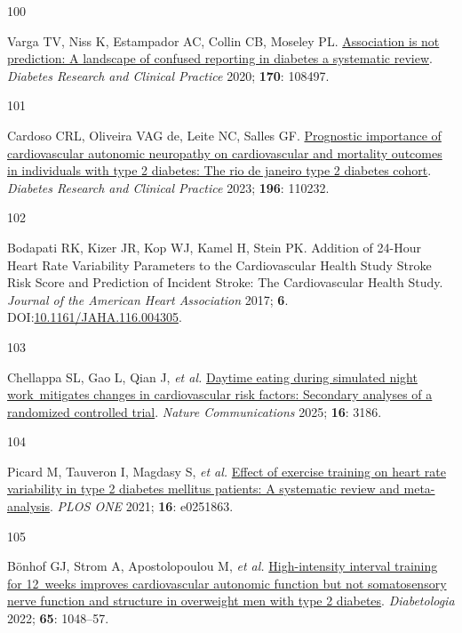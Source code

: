 \documentclass[
  a4paper,
  headsepline=true,
  open=any]{scrbook}
\newlength{\cslhangindent}
\newlength{\csllabelwidth}
\newlength{\cslentryspacingunit} %
\newenvironment{CSLReferences}[2] %
 {%
  \setlength{\parindent}{0pt}
  \ifodd #1
  \let\oldpar\par
  \def\par{\hangindent=\cslhangindent\oldpar}
  \fi
  \setlength{\parskip}{#2\cslentryspacingunit}
 }%
 {}
\newcommand{\CSLLeftMargin}[1]{\parbox[t]{\csllabelwidth}{#1}}
\newcommand{\CSLRightInline}[1]{\parbox[t]{\linewidth - \csllabelwidth}{#1}\break}
\begin{document}
\begin{CSLReferences}{0}{0}
\leavevmode{}%
\CSLLeftMargin{100 }%
\CSLRightInline{Varga TV, Niss K, Estampador AC, Collin CB, Moseley PL.
\href{https://doi.org/10.1016/j.diabres.2020.108497}{Association is not
prediction: A landscape of confused reporting in diabetes {\textendash}
a systematic review}. \emph{Diabetes Research and Clinical Practice}
2020; \textbf{170}: 108497.}

\leavevmode{}%
\CSLLeftMargin{101 }%
\CSLRightInline{Cardoso CRL, Oliveira VAG de, Leite NC, Salles GF.
\href{https://doi.org/10.1016/j.diabres.2022.110232}{Prognostic
importance of cardiovascular autonomic neuropathy on cardiovascular and
mortality outcomes in individuals with type 2 diabetes: The rio de
janeiro type 2 diabetes cohort}. \emph{Diabetes Research and Clinical
Practice} 2023; \textbf{196}: 110232.}

\leavevmode{}%
\CSLLeftMargin{102 }%
\CSLRightInline{Bodapati RK, Kizer JR, Kop WJ, Kamel H, Stein PK.
Addition of 24-Hour Heart Rate Variability Parameters to the
Cardiovascular Health Study Stroke Risk Score and Prediction of Incident
Stroke: The Cardiovascular Health Study. \emph{Journal of the American
Heart Association} 2017; \textbf{6}.
DOI:\href{https://doi.org/10.1161/JAHA.116.004305}{10.1161/JAHA.116.004305}.}

\leavevmode{}%
\CSLLeftMargin{103 }%
\CSLRightInline{Chellappa SL, Gao L, Qian J, \emph{et al.}
\href{https://doi.org/10.1038/s41467-025-57846-y}{Daytime eating during
simulated night work~mitigates changes in cardiovascular risk factors:
Secondary analyses of a randomized controlled trial}. \emph{Nature
Communications} 2025; \textbf{16}: 3186.}

\leavevmode{}%
\CSLLeftMargin{104 }%
\CSLRightInline{Picard M, Tauveron I, Magdasy S, \emph{et al.}
\href{https://doi.org/10.1371/journal.pone.0251863}{Effect of exercise
training on heart rate variability in type 2 diabetes mellitus patients:
A systematic review and meta-analysis}. \emph{PLOS ONE} 2021;
\textbf{16}: e0251863.}

\leavevmode{}%
\CSLLeftMargin{105 }%
\CSLRightInline{Bönhof GJ, Strom A, Apostolopoulou M, \emph{et al.}
\href{https://doi.org/10.1007/s00125-022-05674-w}{High-intensity
interval training for 12~weeks improves cardiovascular autonomic
function but not somatosensory nerve function and structure in
overweight men with type 2 diabetes}. \emph{Diabetologia} 2022;
\textbf{65}: 1048--57.}


\end{CSLReferences}
\end{document}
